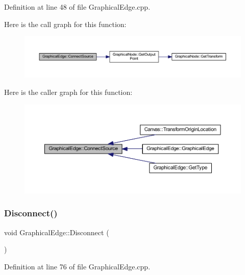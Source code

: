 Definition at line 48 of file Graphical\+Edge.\+cpp.

Here is the call graph for this function\+:
\nopagebreak
\begin{figure}[H]
\begin{center}
\leavevmode
\includegraphics[width=350pt]{class_graphical_edge_a9f2e7f370705c390ad67f5b18ed80a00_cgraph}
\end{center}
\end{figure}
Here is the caller graph for this function\+:
\nopagebreak
\begin{figure}[H]
\begin{center}
\leavevmode
\includegraphics[width=350pt]{class_graphical_edge_a9f2e7f370705c390ad67f5b18ed80a00_icgraph}
\end{center}
\end{figure}
\mbox{\label{class_graphical_edge_acc50ad4ea639802ce7d700d17f28f0e3}} 
\subsubsection{\texorpdfstring{Disconnect()}{Disconnect()}}
{\footnotesize\ttfamily void Graphical\+Edge\+::\+Disconnect (\begin{DoxyParamCaption}{ }\end{DoxyParamCaption})}



Definition at line 76 of file Graphical\+Edge.\+cpp.

